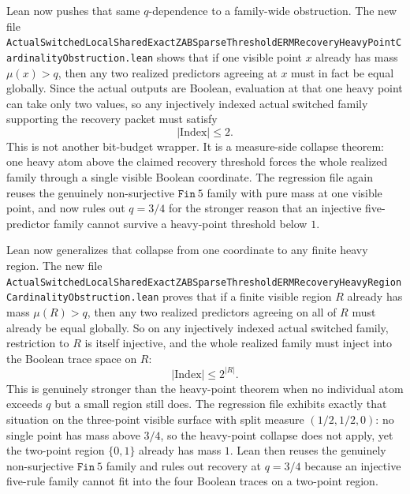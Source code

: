\documentclass[11pt]{article}
\theoremstyle{remark}
\begin{document}
Lean now pushes that same \(q\)-dependence to a family-wide obstruction.  The
new file
\texttt{ActualSwitchedLocalSharedExactZABSparseThresholdERMRecoveryHeavyPointCardinalityObstruction.lean}
shows that if one visible point \(x\) already has mass \(\mu(x) > q\), then any
two realized predictors agreeing at \(x\) must in fact be equal globally.  Since
the actual outputs are Boolean, evaluation at that one heavy point can take only
two values, so any injectively indexed actual switched family supporting the
recovery packet must satisfy
\[
  |\mathrm{Index}| \le 2.
\]
This is not another bit-budget wrapper.  It is a measure-side collapse theorem:
one heavy atom above the claimed recovery threshold forces the whole realized
family through a single visible Boolean coordinate.  The regression file again
reuses the genuinely non-surjective \(\texttt{Fin}\ 5\) family with pure mass at
one visible point, and now rules out \(q = 3/4\) for the stronger reason that
an injective five-predictor family cannot survive a heavy-point threshold below
\(1\).

Lean now generalizes that collapse from one coordinate to any finite heavy
region.  The new file
\texttt{ActualSwitchedLocalSharedExactZABSparseThresholdERMRecoveryHeavyRegionCardinalityObstruction.lean}
proves that if a finite visible region \(R\) already has mass
\(\mu(R) > q\), then any two realized predictors agreeing on all of \(R\) must
already be equal globally.  So on any injectively indexed actual switched
family, restriction to \(R\) is itself injective, and the whole realized family
must inject into the Boolean trace space on \(R\):
\[
  |\mathrm{Index}| \le 2^{|R|}.
\]
This is genuinely stronger than the heavy-point theorem when no individual atom
exceeds \(q\) but a small region still does.  The regression file exhibits
exactly that situation on the three-point visible surface with split measure
\((1/2, 1/2, 0)\): no single point has mass above \(3/4\), so the heavy-point
collapse does not apply, yet the two-point region \(\{0,1\}\) already has mass
\(1\).  Lean then reuses the genuinely non-surjective \(\texttt{Fin}\ 5\)
family and rules out recovery at \(q = 3/4\) because an injective five-rule
family cannot fit into the four Boolean traces on a two-point region.
\end{document}
